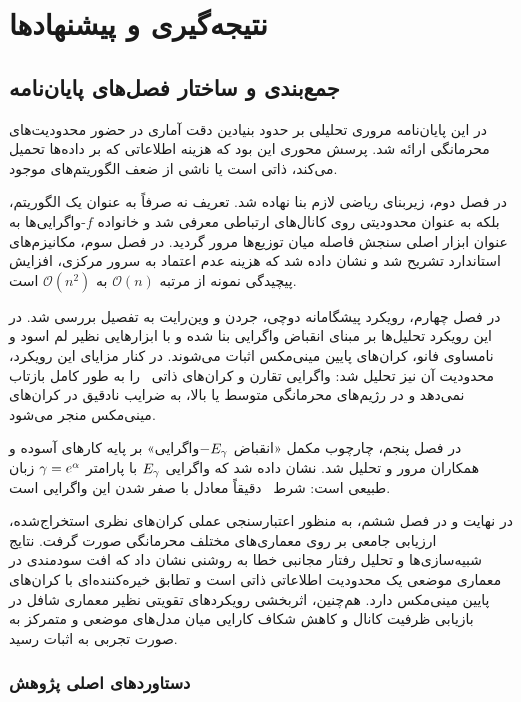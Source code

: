 \chapter{نتیجه‌گیری و پیشنهادها}
\label{ch:conclusion}

\section{جمع‌بندی و ساختار فصل‌های پایان‌نامه}
\label{sec:conclusion:summary}

در این پایان‌نامه مروری تحلیلی بر حدود بنیادین دقت آماری در حضور محدودیت‌های محرمانگی ارائه شد. پرسش محوری این بود که هزینه اطلاعاتی که  بر داده‌ها تحمیل می‌کند، ذاتی است یا ناشی از ضعف الگوریتم‌های موجود.

در فصل دوم، زیربنای ریاضی لازم بنا نهاده شد. تعریف  نه صرفاً به عنوان یک الگوریتم، بلکه به عنوان محدودیتی روی کانال‌های ارتباطی معرفی شد و خانواده $f$-واگرایی‌ها به عنوان ابزار اصلی سنجش فاصله میان توزیع‌ها مرور گردید. در فصل سوم، مکانیزم‌های استاندارد  تشریح شد و نشان داده شد که هزینه عدم اعتماد به سرور مرکزی، افزایش پیچیدگی نمونه از مرتبه $\mathcal{O}(n)$ به $\mathcal{O}(n^2)$ است.

در فصل چهارم، رویکرد پیشگامانه دوچی، جردن و وین‌رایت \cite{duchi2018} به تفصیل بررسی شد. در این رویکرد تحلیل‌ها بر مبنای انقباض واگرایی  بنا شده و با ابزارهایی نظیر لم اسود و نامساوی فانو، کران‌های پایین مینی‌مکس اثبات می‌شوند. در کنار مزایای این رویکرد، محدودیت آن نیز تحلیل شد: واگرایی  تقارن و کران‌های ذاتی \LDP\ را به طور کامل بازتاب نمی‌دهد و در رژیم‌های محرمانگی متوسط یا بالا، به ضرایب نادقیق در کران‌های مینی‌مکس منجر می‌شود.

در فصل پنجم، چارچوب مکمل «انقباض $-E_\gam$واگرایی» بر پایه کارهای آسوده و همکاران \cite{Asoodeh2021, Asoodeh2024} مرور و تحلیل شد. نشان داده شد که واگرایی $E_\gam$ با پارامتر $\gam = e^\al$ زبان طبیعی  است: شرط \LDP\ دقیقاً معادل با صفر شدن این واگرایی است.

در نهایت و در فصل ششم، به منظور اعتبارسنجی عملی کران‌های نظری استخراج‌شده، ارزیابی جامعی بر روی معماری‌های مختلف محرمانگی صورت گرفت. نتایج شبیه‌سازی‌ها و تحلیل رفتار مجانبی خطا به روشنی نشان داد که افت سودمندی در معماری موضعی یک محدودیت اطلاعاتی ذاتی است و تطابق خیره‌کننده‌ای با کران‌های پایین مینی‌مکس دارد. هم‌چنین، اثربخشی رویکردهای تقویتی نظیر معماری شافل در بازیابی ظرفیت کانال و کاهش شکاف کارایی میان مدل‌های موضعی و متمرکز به صورت تجربی به اثبات رسید.


\subsection{دستاوردهای اصلی پژوهش}

